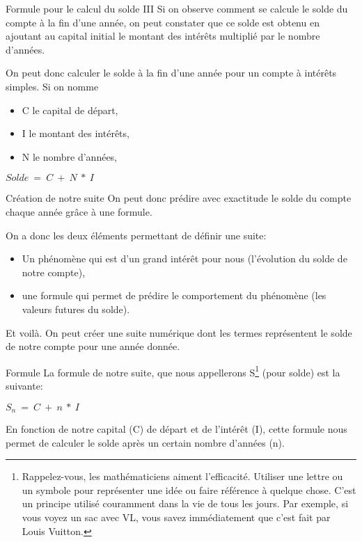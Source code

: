 \documentclass{beamer}
\begin{document}
\begin{frame}{Formule pour le calcul du solde III}
  Si on observe comment se calcule le solde du compte à la fin d'une année, on peut constater que ce solde est obtenu en ajoutant au capital initial le montant des intérêts multiplié par le nombre d'années.

  On peut donc calculer le solde à la fin d'une année pour un compte à intérêts simples. Si on nomme
  \begin{itemize}
    \item C le capital de départ,
    \item I le montant des intérêts,
    \item N le nombre d'années,
  \end{itemize}

\begin{center}
  \begin{math}
    Solde\ =\ C\ +\ N\ *\ I\
  \end{math}
\end{center}   
\end{frame}

\begin{frame}{Création de notre suite}
  On peut donc prédire avec exactitude le solde du compte chaque année grâce à une formule.
  
  On a donc les deux éléments permettant de définir une suite:
  \begin{itemize}
    \item Un phénomène qui est d'un grand intérêt pour nous (l'évolution du solde de notre compte),
    \item une formule qui permet de prédire le comportement du phénomène (les valeurs futures du solde).
  \end{itemize} 

  Et voilà. On peut créer une suite numérique dont les termes représentent le solde de notre compte pour une année donnée.
\end{frame}

\begin{frame}{Formule}
  La formule de notre suite, que nous appellerons S\footnote{Rappelez-vous, les mathématiciens aiment l'efficacité. Utiliser une lettre ou un symbole pour représenter une idée ou faire référence à quelque chose. C'est un principe utilisé couramment dans la vie de tous les jours. Par exemple, si vous voyez un sac avec VL, vous savez immédiatement que c'est fait par Louis Vuitton. } (pour solde) est la suivante:
  \begin{center}
    \begin{math}
      S_{n}\ =\ C\ +\ n\ *\ I
    \end{math}
  \end{center}

En fonction de notre capital (C) de départ et de l'intérêt (I), cette formule nous permet de calculer le solde après un certain nombre d'années (n).
\end{frame}
\end{document}
